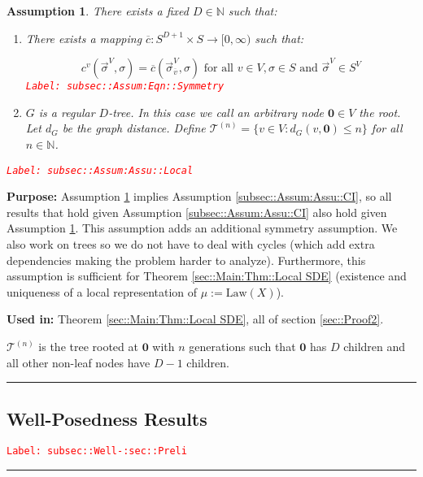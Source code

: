 \documentclass[12pt]{article}
\newcommand{\mb}{\mathbb}
\newcommand{\mc}{\mathcal}
\newcommand{\ra}{\rightarrow}
\newcommand{\ov}{\overline}
\newcommand{\te}{\text}
\newcommand{\tr}{\textcolor{red}}
\newcommand{\labe}[1]{\tr{\texttt{Label: #1}}}
\newcommand{\purpose}{\textbf{Purpose: }}
\newcommand{\usein}{\textbf{Used in: }}
\newcommand{\ind}{\hspace{24pt}}
\newcommand{\lin}{\rule{\linewidth}{0.4 pt}}
\newcommand{\defeq}{:=}								%
\renewcommand{\root}{\mathbf{0}}				%
\renewcommand{\v}{v}							%
\renewcommand{\S}{S}							%
\newcommand{\s}{\sigma}							%
\newcommand{\sv}{\vec{\s}}						%
\newcommand{\X}{X}								%
\newcommand{\IGr}{c}							%
\newcommand{\vind}[1]{^{#1}}					%
\newcommand{\carp}[1]{^{#1}}					%
\newcommand{\vsi}[1]{^{#1}}						%
\newcommand{\cind}[1]{_{#1}}					%
\newcommand{\cl}{\ov}							%
\newcommand{\degr}{D}							%
\newcommand{\IGrg}{\ov{c}}						%
\newcommand{\gdist}{d_G}						%
\newcommand{\tree}{\mc{T}}						%
\newcommand{\sln}[1]{^{(#1)}}					%
\newcommand{\m}{\mu}							%
\newcommand{\law}{\te{Law}}						%
\newtheorem{assu}[thms]{Assumption}
\begin{document}
\begin{assu}
There exists a fixed \(\degr\in \mb{N}\) such that:

\begin{enumerate}
\item There exists a mapping \(\IGrg: \S\carp{\degr+1} \times \S \ra [0,\infty)\) such that:

\begin{equation}
\IGr\vind{\v}(\sv\vsi{V},\s) = \IGrg(\sv\cind{\cl{\v}}\vsi{V},\s) \te{ for all } \v\in V, \s\in \S\te{ and } \sv\vsi{V} \in \S\carp{V}
\label{subsec::Assum:Eqn::Symmetry}
\end{equation}
\labe{subsec::Assum:Eqn::Symmetry}

\item \(G\) is a regular \(\degr\)-tree. In this case we call an arbitrary node \(\root\in V\) the root. Let \(\gdist\) be the graph distance. Define \(\tree\sln{n} = \{\v \in V: \gdist(\v,\root) \leq n\}\) for all \(n\in \mb{N}\).
\end{enumerate}
\label{subsec::Assum:Assu::Local}\labe{subsec::Assum:Assu::Local}
\end{assu}

\purpose Assumption \ref{subsec::Assum:Assu::Local} implies Assumption \ref{subsec::Assum:Assu::CI}, so all results that hold given Assumption \ref{subsec::Assum:Assu::CI} also hold given Assumption \ref{subsec::Assum:Assu::Local}. This assumption adds an additional symmetry assumption. We also work on trees so we do not have to deal with cycles (which add extra dependencies making the problem harder to analyze). Furthermore, this assumption is sufficient for Theorem \ref{sec::Main:Thm::Local SDE} (existence and uniqueness of a local representation of \(\m \defeq \law(\X)\)).

\usein Theorem \ref{sec::Main:Thm::Local SDE}, all of section \ref{sec::Proof2}.

\ind \(\tree\sln{n}\) is the tree rooted at \(\root\) with \(n\) generations such that \(\root\) has \(\degr\) children and all other non-leaf nodes have \(\degr-1\) children.

\lin

\subsection{Well-Posedness Results}
\label{subsec::Well-:sec::Preli}\labe{subsec::Well-:sec::Preli}

\rule{\linewidth}{0.4 pt}
\end{document}
